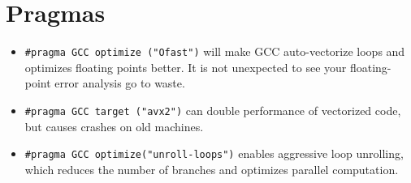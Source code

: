 \section*{Pragmas}
	\begin{itemize}
		\item \lstinline{#pragma GCC optimize ("Ofast")} will make GCC auto-vectorize loops and optimizes floating points better. 
		It is not unexpected to see your floating-point error analysis go to waste.
		\item \lstinline{#pragma GCC target ("avx2")} can double performance of vectorized code, but causes crashes on old machines.
		\item \lstinline{#pragma GCC optimize("unroll-loops")} enables aggressive loop unrolling, which reduces the number of branches and optimizes parallel computation.
	\end{itemize}
